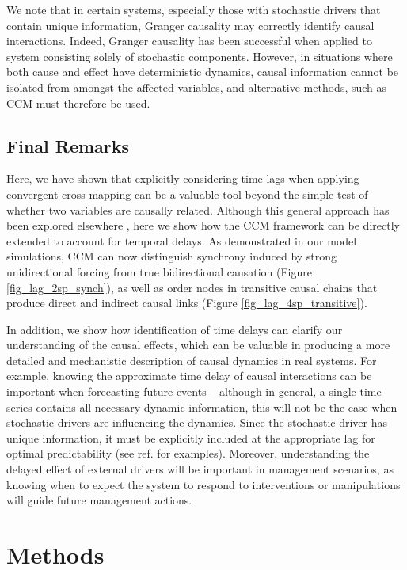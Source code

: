 We note that in certain systems, especially those with stochastic drivers that contain unique information, Granger causality may correctly identify causal interactions. Indeed, Granger causality has been successful when applied to system consisting solely of stochastic components. However, in situations where both cause and effect have deterministic dynamics, causal information cannot be isolated from amongst the affected variables, and alternative methods, such as CCM must therefore be used.

\subsection{Final Remarks}

Here, we have shown that explicitly considering time lags when applying convergent cross mapping can be a valuable tool beyond the simple test of whether two variables are causally related. Although this general approach has been explored elsewhere \cite{Schumacher_2015}, here we show how the CCM framework can be directly extended to account for temporal delays. As demonstrated in our model simulations, CCM can now distinguish synchrony induced by strong unidirectional forcing from true bidirectional causation (Figure \ref{fig_lag_2sp_synch}), as well as order nodes in transitive causal chains that produce direct and indirect causal links (Figure \ref{fig_lag_4sp_transitive}). 

In addition, we show how identification of time delays can clarify our understanding of the causal effects, which can be valuable in producing a more detailed and mechanistic description of causal dynamics in real systems. For example, knowing the approximate time delay of causal interactions can be important when forecasting future events -- although in general, a single time series contains all necessary dynamic information, this will not be the case when stochastic drivers are influencing the dynamics. Since the stochastic driver has unique information, it must be explicitly included at the appropriate lag for optimal predictability (see ref. \cite{Deyle_2013, Ye_2015} for examples). Moreover, understanding the delayed effect of external drivers will be important in management scenarios, as knowing when to expect the system to respond to interventions or manipulations will guide future management actions.

\section{Methods}

